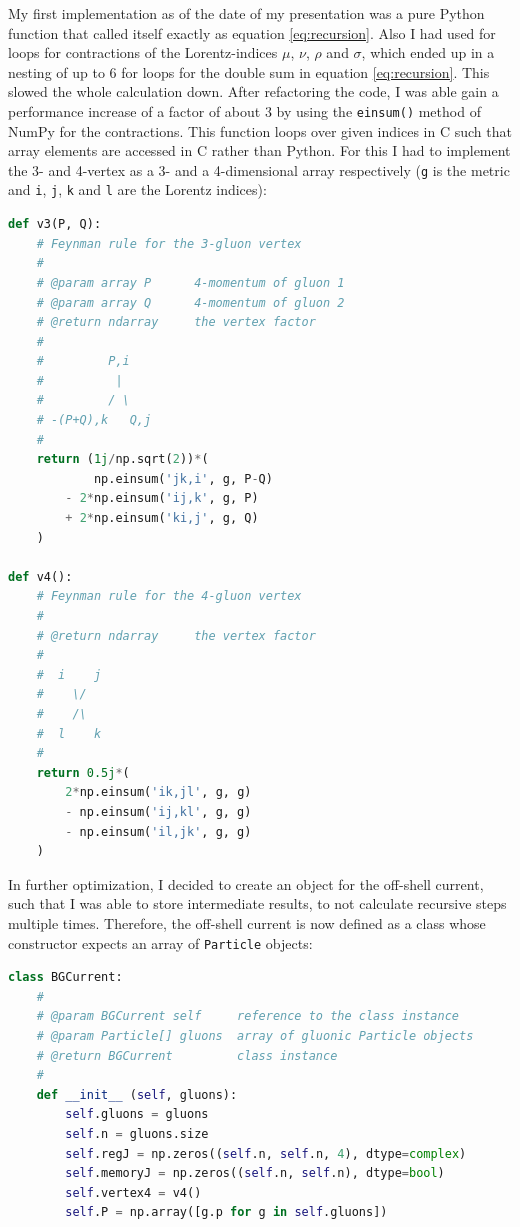 \documentclass{article}
\theoremstyle{definition}
\def\code#1{\texttt{#1}}
\numberwithin{equation}{section}
\begin{document}
My first implementation as of the date of my presentation was a pure Python function that called itself exactly as equation \eqref{eq:recursion}. Also I had used for loops for contractions of the Lorentz-indices $\mu$, $\nu$, $\rho$ and $\sigma$, which ended up in a nesting of up to $6$ for loops for the double sum in equation \eqref{eq:recursion}. This slowed the whole calculation down. After refactoring the code, I was able gain a performance increase of a factor of about $3$ by using the \code{einsum()} method of NumPy for the contractions. This function loops over given indices in C such that array elements are accessed in C rather than Python. For this I had to implement the 3- and 4-vertex as a 3- and a 4-dimensional array respectively (\code{g} is the metric and \code{i}, \code{j}, \code{k} and \code{l} are the Lorentz indices):

\begin{lstlisting}[language=Python]
def v3(P, Q):
    # Feynman rule for the 3-gluon vertex
    #
    # @param array P      4-momentum of gluon 1
    # @param array Q      4-momentum of gluon 2
    # @return ndarray     the vertex factor
    #
    #         P,i
    #          |
    #         / \
    # -(P+Q),k   Q,j
    #
    return (1j/np.sqrt(2))*(
            np.einsum('jk,i', g, P-Q)
        - 2*np.einsum('ij,k', g, P)
        + 2*np.einsum('ki,j', g, Q)
    )

def v4():
    # Feynman rule for the 4-gluon vertex
    #
    # @return ndarray     the vertex factor
    #
    #  i    j
    #    \/
    #    /\
    #  l    k
    # 
    return 0.5j*(
        2*np.einsum('ik,jl', g, g)
        - np.einsum('ij,kl', g, g)
        - np.einsum('il,jk', g, g)
    )
\end{lstlisting}

In further optimization, I decided to create an object for the off-shell current, such that I was able to store intermediate results, to not calculate recursive steps multiple times. Therefore, the off-shell current is now defined as a class whose constructor expects an array of \code{Particle} objects:

\begin{lstlisting}[language=Python, label=lst:constructor, caption=Berends-Giele current object]
class BGCurrent:
    #
    # @param BGCurrent self     reference to the class instance
    # @param Particle[] gluons  array of gluonic Particle objects
    # @return BGCurrent         class instance
    #
    def __init__ (self, gluons):
        self.gluons = gluons
        self.n = gluons.size
        self.regJ = np.zeros((self.n, self.n, 4), dtype=complex)
        self.memoryJ = np.zeros((self.n, self.n), dtype=bool)
        self.vertex4 = v4()
        self.P = np.array([g.p for g in self.gluons])
\end{lstlisting}
\end{document}
